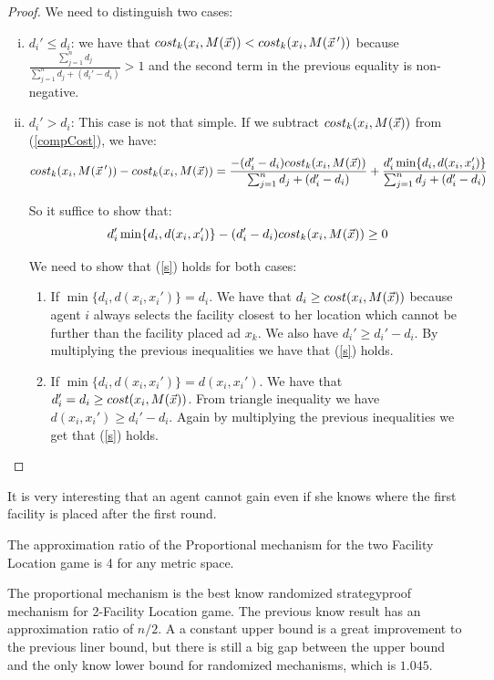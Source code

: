 \begin{proof}
We need to distinguish two cases:
\begin{enumerate}[(i)]
    \item $d_i' \le d_i$: we have that $cost_k(x_i,M(\vec{x})) < cost_k(x_i,M(\vec{x}\,'))$ because $\frac{\sum_{j=1}^{n}d_j }{\sum_{j=1 }^{n}d_j + (d_i'-d_i) }>1$ and the second term in the previous equality is non-negative.
    \item $d_i' > d_i$: This case is not that simple. If we subtract $cost_k(x_i,M(\vec{x}))$ from (\ref{compCost}), we have:
\[ cost_k(x_i,M(\vec{x}\,')) - cost_k(x_i,M(\vec{x})) =\frac{ -(d_i'-d_i)cost_k(x_i,M(\vec{x}))  }{\sum_{j=1 }^{n}d_j + (d_i'-d_i)} + \frac{d_i' \min\{d_i,d(x_i,x_i')\}}{\sum_{j=1 }^{n}d_j + (d_i'-d_i)}\]

So it suffice to show that:
\begin{equation}\label{s}
   d_i' \min\{d_i,d(x_i,x_i')\}-(d_i'-d_i)cost_k(x_i,M(\vec{x})) \ge 0 
\end{equation}

We need to show that (\ref{s}) holds for both cases:
    \begin{enumerate}
        \item If $\min\{d_i,d(x_i,x_i')\} = d_i$. We have that $d_i \ge cost(x_i,M(\vec{x}))$ because agent $i$ always selects the facility closest to her location which cannot be further than the facility placed ad $x_k$. We also have $d_i' \ge d_i' - d_i$. By multiplying the previous inequalities we have that (\ref{s}) holds.
        \item If $\min\{d_i,d(x_i,x_i')\} = d(x_i,x_i')$. We have that $d_i'=d_i \ge cost(x_i,M(\vec{x}))$. From triangle inequality we have $d(x_i,x_i') \ge d_i'-d_i$. Again by multiplying the previous inequalities we get that (\ref{s}) holds.
    \end{enumerate}
\end{enumerate}

\end{proof}

It is very interesting that an agent cannot gain even if she knows where the first facility is placed after the first round.

\begin{theorem}
The approximation ratio of the Proportional mechanism for the two Facility Location game is 4 for any metric space.
\end{theorem}

The proportional mechanism is the best know randomized strategyproof mechanism for 2-Facility Location game. The previous know result \cite{Lu2009} has an approximation ratio of $n/2$. A a constant upper bound is a great improvement to the previous liner bound, but there is still a big gap between the upper bound and the only know lower bound for randomized mechanisms, which is $1.045$\cite{Lu2009}. 





